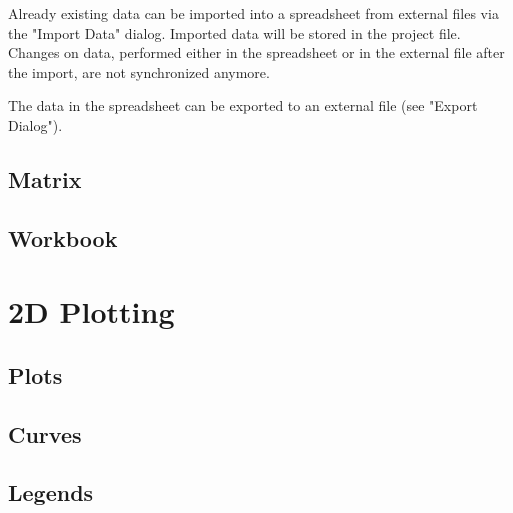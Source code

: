 % 

Already existing data can be imported into a spreadsheet from external files via the "Import Data" dialog.
Imported data will be stored in the project file. Changes on data, performed either in the spreadsheet or in the external file after the import, are not synchronized anymore.

The data in the spreadsheet can be exported to an external file (see "Export Dialog").




\section{Matrix}
\section{Workbook}

\chapter{2D Plotting}
\section{Plots}
\section{Curves}
\section{Legends}



